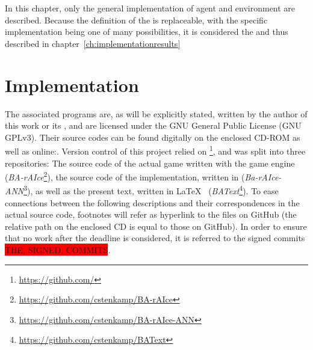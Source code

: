 In this chapter, only the general implementation of agent and environment are described. Because the definition of the  is replaceable, with the specific implementation being one of many possibilities, it is considered the  and thus described in chapter~\ref{ch:implementationresults}

\section{Implementation}

\label{ch:implementation}

The associated programs are, as will be explicitly stated, written by the author of this work or its \leonbase, and are licensed under the GNU General Public License (GNU GPLv3). Their source codes can be found digitally on the enclosed CD-ROM as well as online:. Version control of this project relied on \footnote{\url{https://github.com/}}, and was split into three repositories: The source code of the actual game written with the game engine  (\textit{BA-rAIce}\footnote{\url{https://github.com/cstenkamp/BA-rAIce}}), the source code of the implementation, written in  (\textit{Ba-rAIce-ANN}\footnote{\url{https://github.com/cstenkamp/BA-rAIce-ANN}}), as well as the present text, written in \LaTeX ~ (\textit{BAText}\footnote{\url{https://github.com/cstenkamp/BAText}}). To ease connections between the following descriptions and their correspondences in the actual source code, footnotes will refer as hyperlink to the files on GitHub (the relative path on the enclosed CD is equal to those on GitHub). In order to ensure that no work after the deadline is considered, it is referred to the signed commits \colorbox{red}{THE, SIGNED, COMMITS}.

